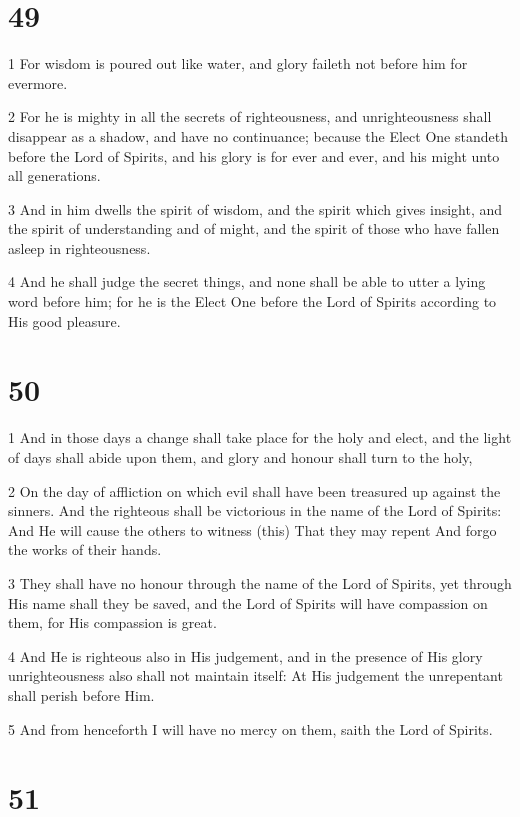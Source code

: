\chapter{49}

\par 1 For wisdom is poured out like water, and glory faileth not before him for evermore.
\par 2 For he is mighty in all the secrets of righteousness, and unrighteousness shall disappear as a shadow, and have no continuance; because the Elect One standeth before the Lord of Spirits, and his glory is for ever and ever, and his might unto all generations.
\par 3 And in him dwells the spirit of wisdom, and the spirit which gives insight, and the spirit of understanding and of might, and the spirit of those who have fallen asleep in righteousness.
\par 4 And he shall judge the secret things, and none shall be able to utter a lying word before him; for he is the Elect One before the Lord of Spirits according to His good pleasure.

\chapter{50}

\par 1 And in those days a change shall take place for the holy and elect, and the light of days shall abide upon them, and glory and honour shall turn to the holy,
\par 2 On the day of affliction on which evil shall have been treasured up against the sinners. And the righteous shall be victorious in the name of the Lord of Spirits: And He will cause the others to witness (this) That they may repent And forgo the works of their hands.
\par 3 They shall have no honour through the name of the Lord of Spirits, yet through His name shall they be saved, and the Lord of Spirits will have compassion on them, for His compassion is great.
\par 4 And He is righteous also in His judgement, and in the presence of His glory unrighteousness also shall not maintain itself: At His judgement the unrepentant shall perish before Him.
\par 5 And from henceforth I will have no mercy on them, saith the Lord of Spirits.

\chapter{51}

